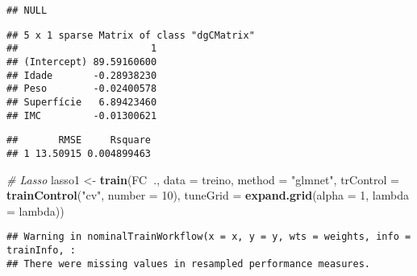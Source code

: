 \documentclass[]{article}
\newenvironment{Shaded}{\begin{snugshade}}{\end{snugshade}}
\newcommand{\CommentTok}[1]{\textcolor[rgb]{0.56,0.35,0.01}{\textit{#1}}}
\newcommand{\DataTypeTok}[1]{\textcolor[rgb]{0.13,0.29,0.53}{#1}}
\newcommand{\DecValTok}[1]{\textcolor[rgb]{0.00,0.00,0.81}{#1}}
\newcommand{\KeywordTok}[1]{\textcolor[rgb]{0.13,0.29,0.53}{\textbf{#1}}}
\newcommand{\NormalTok}[1]{#1}
\newcommand{\OperatorTok}[1]{\textcolor[rgb]{0.81,0.36,0.00}{\textbf{#1}}}
\newcommand{\StringTok}[1]{\textcolor[rgb]{0.31,0.60,0.02}{#1}}
\begin{document}
\begin{verbatim}
## NULL
\end{verbatim}

\begin{Shaded}
\end{Shaded}

\begin{verbatim}
## 5 x 1 sparse Matrix of class "dgCMatrix"
##                       1
## (Intercept) 89.59160600
## Idade       -0.28938230
## Peso        -0.02400578
## Superfície   6.89423460
## IMC         -0.01300621
\end{verbatim}

\begin{Shaded}
\end{Shaded}

\begin{verbatim}
##       RMSE     Rsquare
## 1 13.50915 0.004899463
\end{verbatim}

\begin{Shaded}
\begin{Highlighting}[]
\CommentTok{# Lasso}
\NormalTok{lasso1 <-}\StringTok{ }\KeywordTok{train}\NormalTok{(FC}\OperatorTok{~}\NormalTok{., }\DataTypeTok{data =}\NormalTok{ treino, }\DataTypeTok{method =} \StringTok{"glmnet"}\NormalTok{, }\DataTypeTok{trControl =} \KeywordTok{trainControl}\NormalTok{(}\StringTok{"cv"}\NormalTok{, }\DataTypeTok{number =} \DecValTok{10}\NormalTok{), }\DataTypeTok{tuneGrid =} \KeywordTok{expand.grid}\NormalTok{(}\DataTypeTok{alpha =} \DecValTok{1}\NormalTok{, }\DataTypeTok{lambda =}\NormalTok{ lambda))}
\end{Highlighting}
\end{Shaded}

\begin{verbatim}
## Warning in nominalTrainWorkflow(x = x, y = y, wts = weights, info = trainInfo, :
## There were missing values in resampled performance measures.
\end{verbatim}
\end{document}
